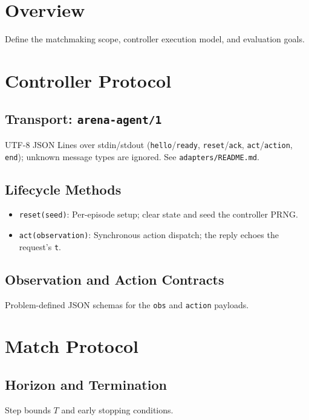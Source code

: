 \documentclass[11pt,a4paper]{article}
\begin{document}
\section{Overview}
Define the matchmaking scope, controller execution model, and evaluation goals.


\section{Controller Protocol}

\subsection{Transport: \texttt{arena-agent/1}}
UTF-8 JSON Lines over stdin/stdout (\texttt{hello}/\texttt{ready}, \texttt{reset}/\texttt{ack},
\texttt{act}/\texttt{action}, \texttt{end}); unknown message types are ignored.
See \texttt{adapters/README.md}.

\subsection{Lifecycle Methods}
\begin{itemize}
    \item \texttt{reset(seed)}: Per-episode setup; clear state and seed the controller PRNG.
    \item \texttt{act(observation)}: Synchronous action dispatch; the reply echoes the request's \texttt{t}.
\end{itemize}

\subsection{Observation and Action Contracts}
Problem-defined JSON schemas for the \texttt{obs} and \texttt{action} payloads.


\section{Match Protocol}

\subsection{Horizon and Termination}
Step bounds $T$ and early stopping conditions.
\end{document}

